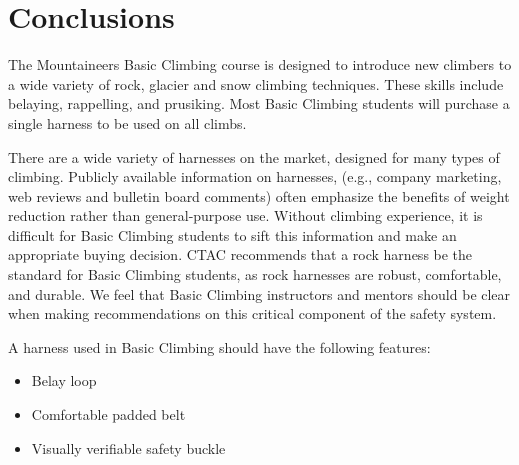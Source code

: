 \documentclass[nonacm,acmtog]{acmart}
\begin{document}
\section{Conclusions}
\label{sec:conclusions}

  The Mountaineers Basic Climbing course is designed to introduce new climbers
  to a wide variety of rock, glacier and snow climbing techniques. These skills
  include belaying, rappelling, and prusiking. Most Basic Climbing students
  will purchase a single harness to be used on all climbs.

  There are a wide variety of harnesses on the market, designed for many types
  of climbing. Publicly available information on harnesses, (e.g., company
  marketing, web reviews and bulletin board comments) often emphasize the
  benefits of weight reduction rather than general-purpose use. Without
  climbing experience, it is difficult for Basic Climbing students to sift this
  information and make an appropriate buying decision. CTAC recommends that a
  rock harness be the standard for Basic Climbing students, as rock harnesses
  are robust, comfortable, and durable. We feel that Basic Climbing instructors
  and mentors should be clear when making recommendations on this critical
  component of the safety system.

  A harness used in Basic Climbing should have the following features:
  \begin{itemize}
  \item Belay loop
  \item Comfortable padded belt
  \item Visually verifiable safety buckle
  \end{itemize}


\nocite{bmc:harness,mec:harness,rei:harness,rockandice:harness,en:harness,uiaa:harness,astm:harness}



\end{document}
